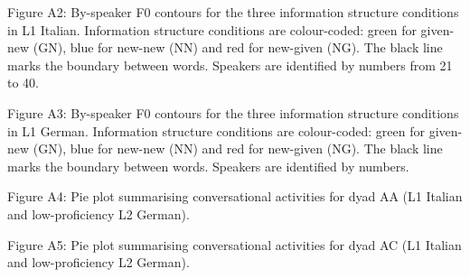   
 

\begin{stylecaption}
Figure A2: By-speaker F0 contours for the three information structure conditions in L1 Italian. Information structure conditions are colour-coded: green for given-new (GN), blue for new-new (NN) and red for new-given (NG). The black line marks the boundary between words. Speakers are identified by numbers from 21 to 40.
\end{stylecaption}

  
 

\begin{stylecaption}
Figure A3: By-speaker F0 contours for the three information structure conditions in L1 German. Information structure conditions are colour-coded: green for given-new (GN), blue for new-new (NN) and red for new-given (NG). The black line marks the boundary between words. Speakers are identified by numbers.
\end{stylecaption}

  
 

\begin{stylecaption}
Figure A4: Pie plot summarising conversational activities for dyad AA (L1 Italian and low-proficiency L2 German).
\end{stylecaption}

\begin{stylecaption}
  
 
\end{stylecaption}

\begin{stylecaption}
Figure A5: Pie plot summarising conversational activities for dyad AC (L1 Italian and low-proficiency L2 German).
\end{stylecaption}

\begin{stylecaption}
  
 
\end{stylecaption}

